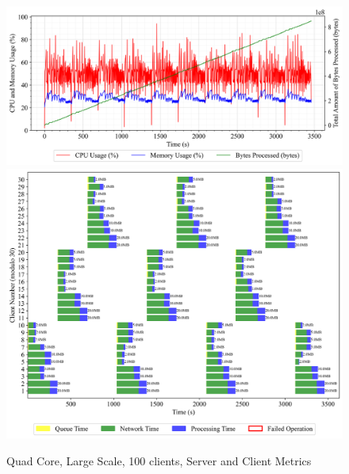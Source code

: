 \newpage
\begin{figure}[h!t]
    \begin{center}
    \label{Fig:A1.12}
    \caption{Quad Core, Large Scale, 100 clients, Server and Client Metrics}
    \includegraphics[width=\xLarge\textwidth]{Chapter4/Results/4c_results/arty-a7-4c_large_scale_1000_20241003_140220.db_server_metrics.png}
    \includegraphics[width=\xLarge\textwidth]{Chapter4/Results/4c_results/arty-a7-4c_large_scale_1000_20241003_140220.db_client_tasks.png}
    \end{center}
\end{figure}

\newpage
